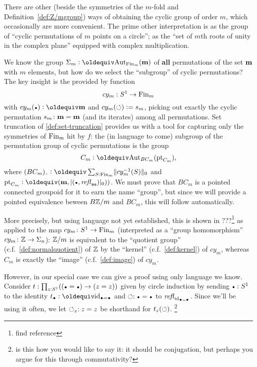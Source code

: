 \begin{example}

There are other (beside the symmetries of the $m$-fold \covering and Definition~\ref{def:Z/mgroup}) ways of obtaining the cyclic group of order $m$, which occasionally are more convenient.  The prime other interpretation is as the group of ``cyclic permutations of $m$ points on a circle''; \ie as the ``set of $m$th roots of unity in the complex plane'' equipped with complex multiplication.  

We know the group $\Sigma_m\defequi\aut_{\fin_m}(\bn m)$ of {\bf all} permutations of the set $\mathbf{m}$ with $m$ elements, but how do we select the ``subgroup'' of cyclic permutations?  
The key insight is the provided by function 
$$cy_m:S^1\to\operatorname{Fin}_m$$ 
with $cy_m(\base)\defequi\bn m$ and 
$cy_m(\circlearrowleft)\vcentcolon= s_m$, picking out exactly the cyclic permutation $s_m\colon\mathbf{m}=\mathbf{m}$ (and its iterates) among all permutations.  Set truncation of \cref{def:set-truncation} provides us with a tool for capturing only the symmetries of $\operatorname{Fin}_m$ hit by $f$: the (in language to come) subgroup of the permutation group of cyclic permutations is the group
$$C_m\defequi\aut_{BC_m}(\pt_{C_m}),$$
where $(BC_m)_\div\defequi \sum_{S:\fin_m}\Trunc{cy_m^{-1}(S)}_0$ and $\pt_{C_m}\defequi (\bn m,\trunc{(\base,\refl{\bn m})}_0))$.  We must prove that $BC_m$ is a pointed connected groupoid for it to earn the name ``group'', but since we will provide a pointed equivalence beween $B\mathbb{Z}/m$ and $BC_m$, this will follow automatically.

More precisely, but using language not yet established, this is shown in ???\footnote{find reference} as applied to the map $cy_m\colon S^1\to\operatorname{Fin}_m$ (interpreted as a ``group homomorphism'' $cy_m\colon \mathbb{Z}\to\Sigma_n$): $\mathbb{Z}/m$ is equivalent to the ``quotient group'' (c.f.~\cref{def:normalquotient}) of $\mathbb{Z}$ by the ``kernel'' (c.f.~\cref{def:kernel}) of $cy_m$, whereas $C_m$ is exactly the ``image'' (c.f.~\cref{def:image}) of $cy_m$.  

However, in our special case we can give a proof using only language we know.
Consider $t:\prod_{z:S^1}((\base=\base)\to(z=z))$ given by circle induction by sending $\base:S^1$ to the identity $t_\base\defequi\id_{\base=\base}$ and $\Sloop:\base=\base$ to $\refl{\id_{\base=\base}}$.
Since we'll be using it often, we let $\circlearrowleft_z:z=z$ be shorthand for $t_z(\circlearrowleft)$.
\footnote{is this how you would like to say it: it should be conjugation, but perhaps you argue for this through commutativity?} 


\end{example}

